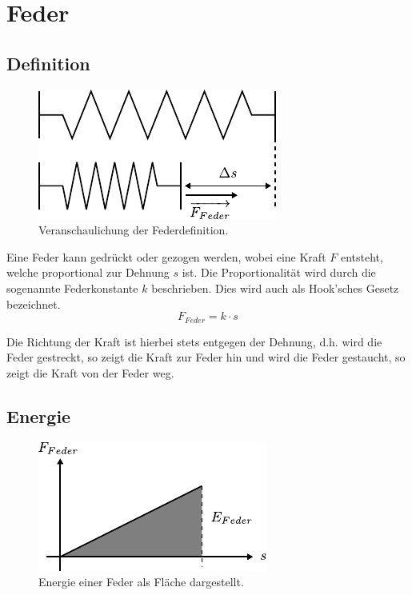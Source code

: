 \chapter{Feder}

\section{Definition}

\begin{figure}[h!]
	\centering
	\includegraphics[scale=0.75]{feder-dehnung.pdf}
	\caption{Veranschaulichung der Federdefinition.}
	\label{fig:feder-dehnung}
\end{figure}

\noindent
Eine Feder kann gedrückt oder gezogen werden, wobei eine Kraft $F$ entsteht,
welche proportional zur Dehnung $s$ ist. Die Proportionalität wird durch die
sogenannte Federkonstante $k$ beschrieben. Dies wird auch als Hook'sches
Gesetz bezeichnet.
\[ \boxed{F_{Feder} = k \cdot s} \]

\noindent
Die Richtung der Kraft ist hierbei stets entgegen der Dehnung, d.h. wird die
Feder gestreckt, so zeigt die Kraft zur Feder hin und wird die Feder
gestaucht, so zeigt die Kraft von der Feder weg.

\section{Energie}

\begin{figure}[h!]
	\centering
	\includegraphics[scale=0.9]{feder-energie.pdf}
	\caption{Energie einer Feder als Fläche dargestellt.}
	\label{fig:feder-energie}
\end{figure}

